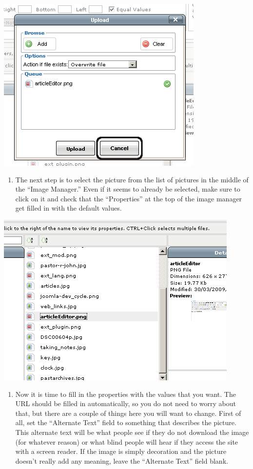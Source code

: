 \documentclass[letterpaper,10pt,english]{manual}
\begin{document}
{\hfill\includegraphics{articleInsertPictureCancelButton1.png}\hfill}
\begin{enumerate}
\item {} 
The next step is to select the picture from the list of pictures in the middle of the “Image Manager.” Even if it seems to already be selected, make sure to click on it and check that the “Properties” at the top of the image manager get filled in with the default values.

\end{enumerate}

{\hfill\includegraphics{articleInsertPictureSelectPicture1.png}\hfill}
\begin{enumerate}
\item {} 
Now it is time to fill in the properties with the values that you want.  The URL should be filled in automatically, so you do not need to worry about that, but there are a couple of things here you will want to change.  First of all, set the “Alternate Text” field to something that describes the picture.  This alternate text will be what people see if they do not download the image (for whatever reason) or what blind people will hear if they access the site with a screen reader.  If the image is simply decoration and the picture doesn't really add any meaning, leave the “Alternate Text” field blank.

\end{enumerate}
\end{document}

